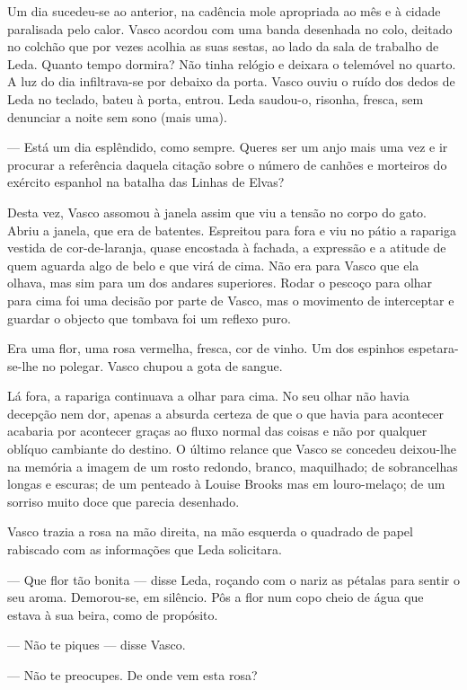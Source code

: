 Um dia sucedeu-se ao anterior, na cadência mole apropriada ao mês e à
cidade paralisada pelo calor. Vasco acordou com uma banda desenhada no
colo, deitado no colchão que por vezes acolhia as suas sestas, ao lado
da sala de trabalho de Leda. Quanto tempo dormira? Não tinha relógio e
deixara o telemóvel no quarto. A luz do dia infiltrava-se por debaixo da
porta. Vasco ouviu o ruído dos dedos de Leda no teclado,
bateu à porta, entrou. Leda saudou-o, risonha, fresca, sem denunciar a
noite sem sono (mais uma).

--- Está um dia esplêndido, como sempre. Queres ser um anjo mais uma vez
e ir procurar a referência daquela citação sobre o número de canhões e
morteiros do exército espanhol na batalha das Linhas de Elvas?

Desta vez, Vasco assomou à janela assim que viu a tensão no corpo do
gato. Abriu a janela, que era de batentes. Espreitou para fora e viu
no pátio a rapariga vestida de cor-de-laranja, quase encostada à fachada, a expressão e a atitude de quem
aguarda algo de belo e que virá de cima. Não era para Vasco que ela
olhava, mas sim para um dos andares superiores. Rodar o pescoço para
olhar para cima foi uma decisão por parte de Vasco, mas o movimento de
interceptar e guardar o objecto que tombava foi um reflexo puro.

Era uma flor, uma rosa vermelha, fresca, cor de vinho. Um dos espinhos
espetara-se-lhe no polegar. Vasco chupou a gota de sangue.

Lá fora, a rapariga continuava a olhar para cima. No seu olhar não havia
decepção nem dor, apenas a absurda certeza de que o que havia para
acontecer acabaria por acontecer graças ao fluxo normal das coisas e não
por qualquer oblíquo cambiante do destino. O último relance que Vasco se
concedeu deixou-lhe na memória a imagem de um rosto redondo, branco,
maquilhado; de sobrancelhas longas e escuras; de um penteado à Louise
Brooks mas em louro-melaço; de um sorriso muito doce que parecia
desenhado.

Vasco trazia a rosa na mão direita, na mão esquerda o quadrado de papel
rabiscado com as informações que Leda solicitara.

--- Que flor tão bonita --- disse Leda, roçando com o nariz
as pétalas para sentir o seu aroma. Demorou-se, em silêncio. Pôs a flor
num copo cheio de água que estava à sua beira, como de propósito.

--- Não te piques --- disse Vasco.

--- Não te preocupes. De onde vem esta rosa?

